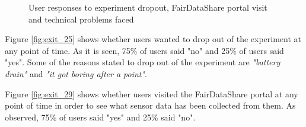 \begin{figure}[htp]
\hspace{1em}
\newline
\centering
{}
\caption{User responses to experiment dropout, FairDataShare portal visit and technical problems faced}
\label{fig:st3}
\end{figure}

Figure \ref{fig:exit_25} shows whether users wanted to drop out of the experiment at any point of time. As it is seen, 75\% of users said "no" and 25\% of users said "yes". Some of the reasons stated to drop out of the experiment are \textit{"battery drain"} and \textit{"it got boring after a point"}.

Figure \ref{fig:exit_29} shows whether users visited the FairDataShare portal at any point of time in order to see what sensor data has been collected from them. As observed, 75\% of users said "yes" and 25\% said "no".

